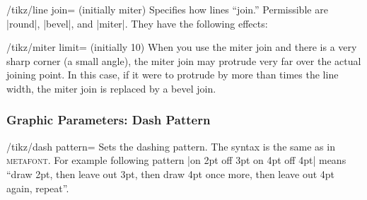 \begin{key}{/tikz/line join= (initially miter)}
  Specifies how lines ``join.'' Permissible  are |round|,
  |bevel|, and |miter|. They have the following effects:

\begin{codeexample}[]
\end{codeexample}

  \begin{key}{/tikz/miter limit= (initially 10)}
    When you use the miter join and there is a very sharp corner (a
    small angle), the miter join may protrude very far over the actual
    joining point. In this case, if it were to protrude by
    more than  times the line width, the miter join is
    replaced by a bevel join.

\begin{codeexample}[]
\end{codeexample}
  \end{key}
\end{key}

\subsubsection{Graphic Parameters: Dash Pattern}

\begin{key}{/tikz/dash pattern=}
  Sets the dashing pattern. The syntax is the same as in
  \textsc{metafont}. For example following pattern
  |on 2pt off 3pt on 4pt off 4pt| means ``draw
  2pt, then leave out 3pt, then draw 4pt once more, then leave out 4pt
  again, repeat''.

\begin{codeexample}[]
\begin{tikzpicture}[dash pattern=on 2pt off 3pt on 4pt off 4pt]
  \draw (0pt,0pt) -- (3.5cm,0pt);
\end{tikzpicture}
\end{codeexample}
\end{key}


